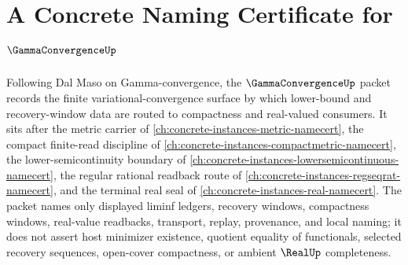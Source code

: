 \chapter{A Concrete Naming Certificate for $\GammaConvergenceUp$}
\label{ch:concrete-instances-gamma-convergence-namecert}

Following Dal Maso on Gamma-convergence, the $\GammaConvergenceUp$ packet records the finite variational-convergence surface by which lower-bound and recovery-window data are routed to compactness and real-valued consumers. It sits after the metric carrier of \autoref{ch:concrete-instances-metric-namecert}, the compact finite-read discipline of \autoref{ch:concrete-instances-compactmetric-namecert}, the lower-semicontinuity boundary of \autoref{ch:concrete-instances-lowersemicontinuous-namecert}, the regular rational readback route of \autoref{ch:concrete-instances-regseqrat-namecert}, and the terminal real seal of \autoref{ch:concrete-instances-real-namecert}. The packet names only displayed liminf ledgers, recovery windows, compactness windows, real-value readbacks, transport, replay, provenance, and local naming; it does not assert host minimizer existence, quotient equality of functionals, selected recovery sequences, open-cover compactness, or ambient $\RealUp$ completeness.

